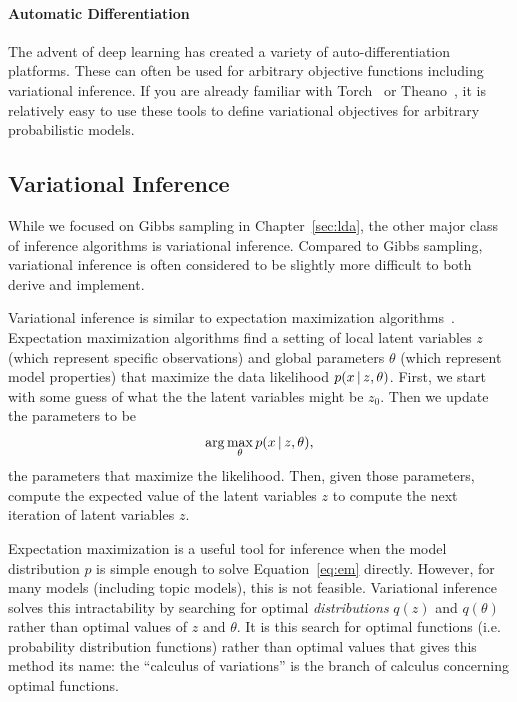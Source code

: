 \paragraph{Automatic Differentiation}

The advent of deep learning has created a variety of
auto-differentiation platforms.  These can often be used for arbitrary
objective functions including variational inference.  If you are
already familiar with Torch~\citep{collobert-11} or Theano~\citep{theano}, it is relatively easy to use
these tools to define variational objectives for arbitrary
probabilistic models.

\subsection{Variational Inference}

While we focused on Gibbs sampling in Chapter~\ref{sec:lda}, the other major
class of inference algorithms is variational inference.  Compared to
Gibbs sampling, variational inference is often considered to be
slightly more difficult to both derive and implement.

Variational inference is similar to expectation maximization
algorithms~\citep{liang-07b}.  Expectation maximization algorithms find a
setting of local latent variables $z$ (which represent specific observations) and global parameters $\theta$ (which represent model properties) that maximize
the data likelihood $p(x \, | \, z, \theta)$.  First, we start with some guess
of what the the latent variables might be $z_0$.  Then we update the
parameters to be
\begin{equation}
  \arg \max_{\theta} p(x \, | \, z, \theta),
\label{eq:em}
\end{equation}
the parameters that maximize the likelihood.  Then, given those
parameters, compute the expected value of the latent variables $z$ to
compute the next iteration of latent variables $z$.

Expectation maximization is a useful tool for inference when the model
distribution $p$ is simple enough to solve Equation~\ref{eq:em}
directly.  However, for many models (including topic models), this is
not feasible.  Variational inference solves this intractability by
searching for optimal {\em distributions} $q(z)$ and $q(\theta)$ rather than optimal values of $z$ and $\theta$.
It is this search for optimal functions (i.e. probability distribution functions) rather than optimal values that gives this method its name: the ``calculus of variations'' is the branch of calculus concerning optimal functions.

